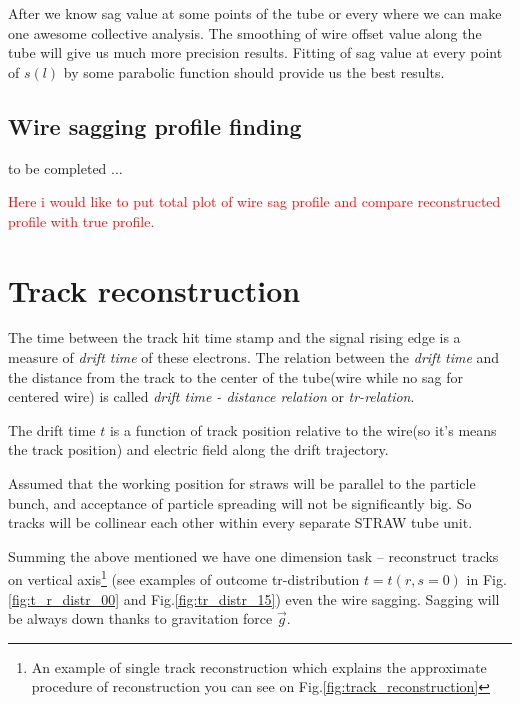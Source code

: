 \documentclass[]{article}
\begin{document}
	After we know sag value at some points of the tube or every where we can make one awesome collective analysis. The smoothing of wire offset value along the tube will give us much more precision results.  Fitting of sag value at  every point of $s(l)$ by some parabolic function should provide us the best results.
	
	\subsection{Wire sagging profile finding}
	
	to be completed	...
	
	\textcolor{red}{Here i would like to put total plot of wire sag profile and compare reconstructed profile with true profile.}
	
	
	\section{Track reconstruction}
	
	The time between the track hit time stamp and the signal rising edge is a measure of {\it drift time} of these electrons. The relation between the   {\it drift time} and  the distance from the track to the center of the tube(wire while no sag for centered wire) is called {\it drift time - distance relation} or {\it tr-relation}.
	
	The drift time $t$ is a function of track position relative to the wire(so it's means the track position) and electric field along the drift trajectory.
	
	Assumed that the working  position  for straws will be parallel to the particle bunch, and  acceptance of particle spreading will not be significantly big. So tracks will be collinear each other within every separate  STRAW tube unit.
	
	Summing the above mentioned we have one dimension task -- reconstruct tracks on vertical axis\footnote{An example of single track reconstruction which explains the approximate procedure of reconstruction you can see on Fig.\ref{fig:track_reconstruction}}	(see examples of outcome tr-distribution $t = t(r,s=0)$ in Fig.\ref{fig:t_r_distr_00} and Fig.\ref{fig:tr_distr_15})  even the wire sagging. Sagging will be always down thanks to gravitation force $\vec{g}$.
	
\end{document}
